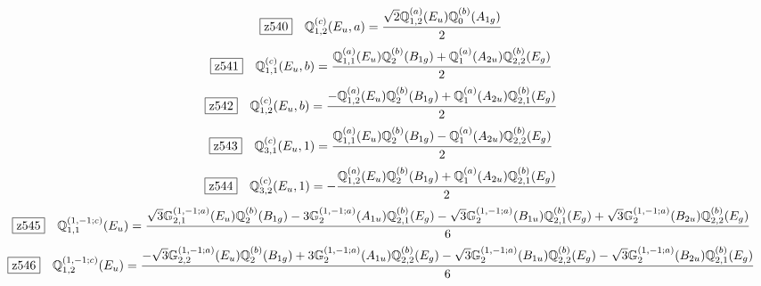 \documentclass[fleqn,10pt,landscape]{jsarticle}
\begin{document}
\begin{dmath*}
\hspace*{3mm}\fbox{z540}\quad \mathbb{Q}_{1,2}^{(c)}(E_{u},a)=\frac{\sqrt{2} \mathbb{Q}_{1,2}^{(a)}(E_{u}) \mathbb{Q}_{0}^{(b)}(A_{1g})}{2}
\end{dmath*}
\begin{dmath*}
\hspace*{3mm}\fbox{z541}\quad \mathbb{Q}_{1,1}^{(c)}(E_{u},b)=\frac{\mathbb{Q}_{1,1}^{(a)}(E_{u}) \mathbb{Q}_{2}^{(b)}(B_{1g}) + \mathbb{Q}_{1}^{(a)}(A_{2u}) \mathbb{Q}_{2,2}^{(b)}(E_{g})}{2}
\end{dmath*}
\begin{dmath*}
\hspace*{3mm}\fbox{z542}\quad \mathbb{Q}_{1,2}^{(c)}(E_{u},b)=\frac{- \mathbb{Q}_{1,2}^{(a)}(E_{u}) \mathbb{Q}_{2}^{(b)}(B_{1g}) + \mathbb{Q}_{1}^{(a)}(A_{2u}) \mathbb{Q}_{2,1}^{(b)}(E_{g})}{2}
\end{dmath*}
\begin{dmath*}
\hspace*{3mm}\fbox{z543}\quad \mathbb{Q}_{3,1}^{(c)}(E_{u},1)=\frac{\mathbb{Q}_{1,1}^{(a)}(E_{u}) \mathbb{Q}_{2}^{(b)}(B_{1g}) - \mathbb{Q}_{1}^{(a)}(A_{2u}) \mathbb{Q}_{2,2}^{(b)}(E_{g})}{2}
\end{dmath*}
\begin{dmath*}
\hspace*{3mm}\fbox{z544}\quad \mathbb{Q}_{3,2}^{(c)}(E_{u},1)=- \frac{\mathbb{Q}_{1,2}^{(a)}(E_{u}) \mathbb{Q}_{2}^{(b)}(B_{1g}) + \mathbb{Q}_{1}^{(a)}(A_{2u}) \mathbb{Q}_{2,1}^{(b)}(E_{g})}{2}
\end{dmath*}
\begin{dmath*}
\hspace*{3mm}\fbox{z545}\quad \mathbb{Q}_{1,1}^{(1,-1;c)}(E_{u})=\frac{\sqrt{3} \mathbb{G}_{2,1}^{(1,-1;a)}(E_{u}) \mathbb{Q}_{2}^{(b)}(B_{1g}) - 3 \mathbb{G}_{2}^{(1,-1;a)}(A_{1u}) \mathbb{Q}_{2,1}^{(b)}(E_{g}) - \sqrt{3} \mathbb{G}_{2}^{(1,-1;a)}(B_{1u}) \mathbb{Q}_{2,1}^{(b)}(E_{g}) + \sqrt{3} \mathbb{G}_{2}^{(1,-1;a)}(B_{2u}) \mathbb{Q}_{2,2}^{(b)}(E_{g})}{6}
\end{dmath*}
\begin{dmath*}
\hspace*{3mm}\fbox{z546}\quad \mathbb{Q}_{1,2}^{(1,-1;c)}(E_{u})=\frac{- \sqrt{3} \mathbb{G}_{2,2}^{(1,-1;a)}(E_{u}) \mathbb{Q}_{2}^{(b)}(B_{1g}) + 3 \mathbb{G}_{2}^{(1,-1;a)}(A_{1u}) \mathbb{Q}_{2,2}^{(b)}(E_{g}) - \sqrt{3} \mathbb{G}_{2}^{(1,-1;a)}(B_{1u}) \mathbb{Q}_{2,2}^{(b)}(E_{g}) - \sqrt{3} \mathbb{G}_{2}^{(1,-1;a)}(B_{2u}) \mathbb{Q}_{2,1}^{(b)}(E_{g})}{6}
\end{dmath*}
\end{document}
